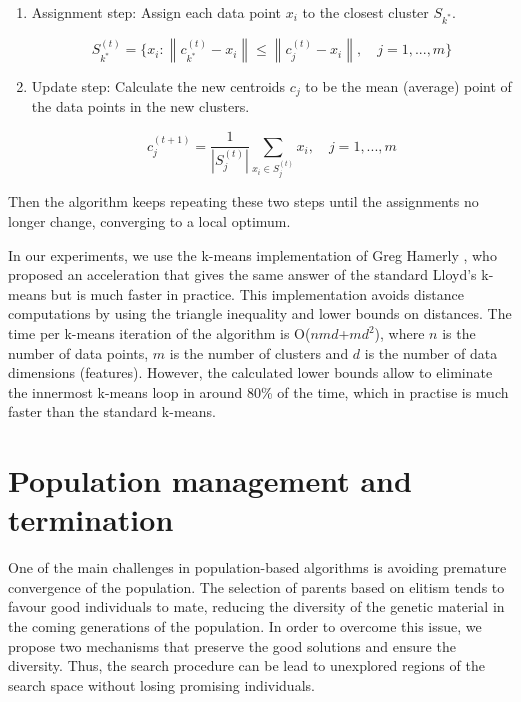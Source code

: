 \begin{enumerate}

	\item Assignment step: Assign each data point $x_i$ to the closest cluster $S_{k^{*}}$.
	
	\begin{equation}
	S_{k^{*}}^{(t)} = \{ x_i: \left \| c_{k^{*}}^{(t)} - x_i \right \| \leq  \left \| c_{j}^{(t)} - x_i \right \|, \quad j = 1, ..., m \}
	\end{equation}
	
	\item Update step: Calculate the new centroids $c_j$ to be the mean (average) point of the data points in the new clusters.
	
	\begin{equation}
	c_{j}^{(t+1)} = \frac{1}{\left | S_{j}^{(t)} \right |} \sum_{x_i \in S_{j}^{(t)}} x_i, \quad j = 1, ..., m
	\end{equation}
		
\end{enumerate}

Then the algorithm keeps repeating these two steps until the assignments no longer change, converging to a local optimum.

In our experiments, we use the k-means implementation of Greg Hamerly \cite{Hamerly2010}, who proposed an acceleration that gives the same answer of the standard Lloyd's k-means \cite{Lloyd1982} but is much faster in practice. This implementation avoids distance computations by using the triangle inequality and lower bounds on distances. The time per k-means iteration of the algorithm is O($nmd$+$md^2$), where $n$ is the number of data points, $m$ is the number of clusters and $d$ is the number of data dimensions (features). However, the calculated lower bounds allow to eliminate the innermost k-means loop in around 80\% of the time, which in practise is much faster than the standard k-means.

\section{Population management and termination}
One of the main challenges in population-based algorithms is avoiding premature convergence of the population. The selection of parents based on elitism tends to favour good individuals to mate, reducing the diversity of the genetic material in the coming generations of the population. In order to overcome this issue, we propose two mechanisms that preserve the good solutions and ensure the diversity. Thus, the search procedure can be lead to unexplored regions of the search space without losing promising individuals.

